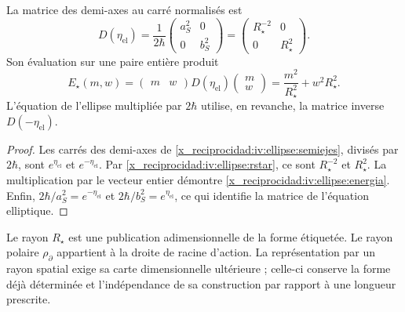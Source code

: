 \begin{proposition}
\label{x_reciprocidad:iv:ellipse:matriz-prop}
La matrice des demi-axes au carré normalisés est
\begin{equation}
 D(\eta_{\mathrm{el}})
 =\frac1{2\hbar}
    \begin{pmatrix}a_S^2&0\\0&b_S^2\end{pmatrix}
 =\begin{pmatrix}R_\star^{-2}&0\\0&R_\star^2\end{pmatrix}.
 \label{x_reciprocidad:iv:ellipse:matriz}
\end{equation}
Son évaluation sur une paire entière produit
\begin{equation}
 E_\star(m,w)=
 \begin{pmatrix}m&w\end{pmatrix}
 D(\eta_{\mathrm{el}})
 \begin{pmatrix}m\\w\end{pmatrix}
 =\frac{m^2}{R_\star^2}+w^2R_\star^2.
 \label{x_reciprocidad:iv:ellipse:energia}
\end{equation}
L’équation de l’ellipse multipliée par \(2\hbar\)
utilise, en revanche, la matrice inverse \(D(-\eta_{\mathrm{el}})\).
\end{proposition}
\begin{proof}
Les carrés des demi-axes de
\eqref{x_reciprocidad:iv:ellipse:semiejes}, divisés par \(2\hbar\),
sont \(e^{\eta_{\mathrm{el}}}\) et
\(e^{-\eta_{\mathrm{el}}}\).
Par \eqref{x_reciprocidad:iv:ellipse:rstar}, ce sont
\(R_\star^{-2}\) et \(R_\star^2\).
La multiplication par le vecteur entier démontre
\eqref{x_reciprocidad:iv:ellipse:energia}. Enfin,
\(2\hbar/a_S^2=e^{-\eta_{\mathrm{el}}}\) et
\(2\hbar/b_S^2=e^{\eta_{\mathrm{el}}}\), ce qui
identifie la matrice de l’équation elliptique.
\end{proof}

Le rayon \(R_\star\) est une publication adimensionnelle de
la forme étiquetée. Le rayon polaire
\(\rho_{\partial}\) appartient à la droite de racine d’action.
La représentation par un rayon spatial exige sa carte
dimensionnelle ultérieure ; celle-ci conserve la forme déjà déterminée
et l’indépendance de sa construction par rapport à une
longueur prescrite.
